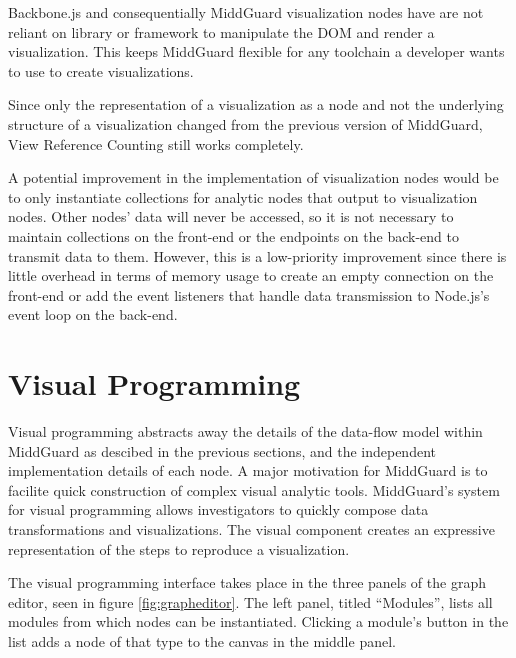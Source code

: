 \documentclass[midd]{thesis}
\begin{document}
Backbone.js and consequentially MiddGuard visualization nodes have are not
reliant on library or framework to manipulate the DOM and render a
visualization. This keeps MiddGuard flexible for any toolchain a developer wants
to use to create visualizations.

Since only the representation of a visualization as a node and not the
underlying structure of a visualization changed from the previous version of
MiddGuard, View Reference Counting still works completely.

A potential improvement in the implementation of visualization nodes would be to
only instantiate collections for analytic nodes that output to visualization
nodes. Other nodes' data will never be accessed, so it is not necessary to
maintain collections on the front-end or the endpoints on the back-end to
transmit data to them. However, this is a low-priority improvement since there
is little overhead in terms of memory usage to create an empty connection on the
front-end or add the event listeners that handle data transmission to Node.js's
event loop on the back-end.

\section{Visual Programming}

Visual programming abstracts away the details of the data-flow model within
MiddGuard as descibed in the previous sections, and the independent
implementation details of each node. A major motivation for MiddGuard is to
facilite quick construction of complex visual analytic tools. MiddGuard's system
for visual programming allows investigators to quickly compose data
transformations and visualizations. The visual component creates an expressive
representation of the steps to reproduce a visualization.

The visual programming interface takes place in the three panels of the graph
editor, seen in figure \ref{fig:grapheditor}. The left panel, titled
``Modules'', lists all modules from which nodes can be instantiated. Clicking a
module's button in the list adds a node of that type to the canvas in the middle
panel.
\end{document}
